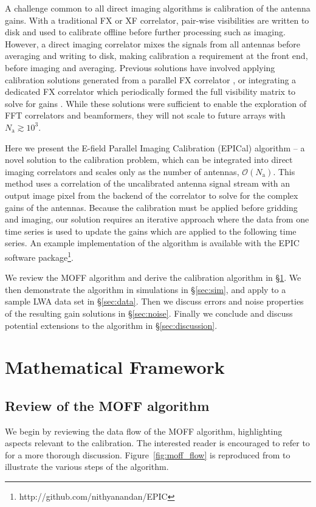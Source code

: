 \documentclass[a4paper,fleqn,usenatbib]{mnras}
\newcommand{\Nant}{\ensuremath{N_{\mathrm{a}}}}
\begin{document}
A challenge common to all direct imaging algorithms is calibration of the antenna gains. With a traditional FX or XF correlator, pair-wise visibilities are written to disk and used to calibrate offline before further processing such as imaging. However, a direct imaging correlator mixes the signals from all antennas before averaging and writing to disk, making calibration a requirement at the front end, before imaging and averaging. Previous solutions have involved applying calibration solutions generated from a parallel FX correlator \citep{zhe14, fos14}, or integrating a dedicated FX correlator which periodically formed the full visibility matrix to solve for gains \citep{wij09,dev09}. While these solutions were sufficient to enable the exploration of FFT correlators and beamformers, they will not scale to future arrays with $\Nant \gtrsim 10^3$.

Here we present the E-field Parallel Imaging Calibration (EPICal) algorithm -- a novel solution to the calibration problem, which can be integrated into direct imaging correlators and scales only as the number of antennas, $\mathcal{O}(\Nant)$. This method uses a correlation of the uncalibrated antenna signal stream with an output image pixel from the backend of the correlator to solve for the complex gains of the antennas. Because the calibration must be applied before gridding and imaging, our solution requires an iterative approach where the data from one time series is used to update the gains which are applied to the following time series. An example implementation of the algorithm is available with the EPIC software package\footnote{http://github.com/nithyanandan/EPIC}.

We review the MOFF algorithm and derive the calibration algorithm in \S \ref{sec:math}. We then demonstrate the algorithm in simulations in \S \ref{sec:sim}, and apply to a sample LWA data set in \S \ref{sec:data}. Then we discuss errors and noise properties of the resulting gain solutions in \S \ref{sec:noise}. Finally we conclude and discuss potential extensions to the algorithm in \S \ref{sec:discussion}.

\section{Mathematical Framework}\label{sec:math}
\subsection{Review of the MOFF algorithm}
We begin by reviewing the data flow of the MOFF algorithm, highlighting aspects relevant to the calibration. The interested reader is encouraged to refer to \citealt{mor11} for a more thorough discussion. Figure~\ref{fig:moff_flow} is reproduced from \citealt{thy15c} to illustrate the various steps of the algorithm.
\end{document}
